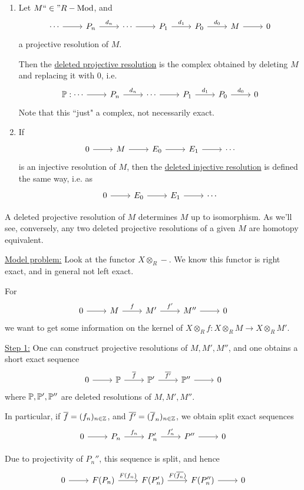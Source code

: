\documentclass[x11names,reqno,14pt]{extarticle}
\newcommand{\fin}{``\in"}
\newcommand{\RMod}{R-\text{Mod}}
\newcommand{\barf}{\bar{f}}
\begin{document}
\begin{enumerate}

\item Let $M \fin \RMod$, and 
\[
\begin{tikzcd}
\cdots \ar[r]& P_n \ar[r, "d_n"] & \cdots \ar[r] & P_1 \ar[r, "d_1"] & P_0 \ar[r, "d_0"] & M \ar[r] & 0
\end{tikzcd}
\]
a projective resolution of $M$.

Then the \underline{deleted projective resolution} is the complex obtained by deleting $M$ and replacing it with 0, i.e.
\[
\begin{tikzcd}
\mbb{P}: \cdots \ar[r]& P_n \ar[r, "d_n"] & \cdots \ar[r] & P_1 \ar[r, "d_1"] & P_0 \ar[r, "d_0"] & 0 
\end{tikzcd}
\]
Note that this ``just" a complex, not necessarily exact. 

\item If 
\[
\begin{tikzcd}
0\ar[r]&M\ar[r]&E_0\ar[r]&E_1\ar[r]&\cdots
\end{tikzcd}
\]
is an injective resolution of $M$, then the \underline{deleted injective resolution} is defined the same way, i.e. as
\[
\begin{tikzcd}
0\ar[r]&E_0\ar[r]&E_1\ar[r]&\cdots
\end{tikzcd}
\]

\end{enumerate}

\rem A deleted projective resolution of $M$ determines $M$ up to isomorphism. As we'll see, conversely, any two deleted projective resolutions of a given $M$ are homotopy equivalent. 

\underline{Model problem:} Look at the functor $X\otimes_R-$. We know this functor is right exact, and in general not left exact. 

For 
\[
\exactshort{M}{f}{M'}{f'}{M''}
\]
we want to get some information on the kernel of $X\otimes_Rf:X\otimes_RM\to X\otimes_RM'$.

\underline{Step 1:} One can construct projective resolutions of $M, M', M''$, and one obtains a short exact sequence
\[
\exactshort{\mbb{P}}{\barf}{\mbb{P}'}{\bar{f'}}{\mbb{P}''}
\]
where $\mathbb{P},\mathbb{P}',\mathbb{P}''$ are deleted resolutions of $M, M', M''$. 

In particular, if $\barf = (f_n)_{n\in\Z}$, and $\bar{f'} = (\barf_n)_{n\in\Z}$, we obtain split exact sequences
\[
\exactshort{P_n}{f_n}{P_n'}{f_n'}{P''}
\]

Due to projectivity of $P_n''$, this sequence is split, and hence
\[
\exactshort{F(P_n)}{F(f_n)}{F(P_n')}{F(\bar{f_n})}{F(P_n'')}
\]
\end{document}
